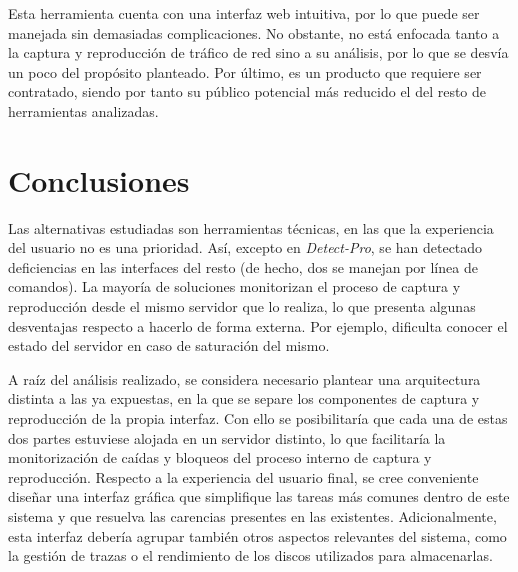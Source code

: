 Esta herramienta cuenta con una interfaz web intuitiva, por lo que puede ser manejada sin demasiadas complicaciones.
No obstante, no está enfocada tanto a la captura y reproducción de tráfico de red sino a su análisis, por lo que se desvía un poco del propósito planteado.
Por último, es un producto que requiere ser contratado, siendo por tanto su público potencial más reducido el del resto de herramientas analizadas.

\section{Conclusiones\label{sec:eda:conclusiones}}

Las alternativas estudiadas son herramientas técnicas, en las que la experiencia del usuario no es una prioridad.
Así, excepto en \textit{Detect-Pro}, se han detectado deficiencias en las interfaces del resto (de hecho, dos se manejan por línea de comandos).
La mayoría de soluciones monitorizan el proceso de captura y reproducción desde el mismo servidor que lo realiza, lo que presenta algunas desventajas respecto a hacerlo de forma externa.
Por ejemplo, dificulta conocer el estado del servidor en caso de saturación del mismo.

A raíz del análisis realizado, se considera necesario plantear una arquitectura distinta a las ya expuestas, en la que se separe los componentes de captura y reproducción de la propia interfaz.
Con ello se posibilitaría que cada una de estas dos partes estuviese alojada en un servidor distinto, lo que facilitaría la monitorización de caídas y bloqueos del proceso interno de captura y reproducción.
Respecto a la experiencia del usuario final, se cree conveniente diseñar una interfaz gráfica que simplifique las tareas más comunes dentro de este sistema y que resuelva las carencias presentes en las existentes.
Adicionalmente, esta interfaz debería agrupar también otros aspectos relevantes del sistema, como la gestión de \glspl{traza} o el rendimiento de los discos utilizados para almacenarlas.
